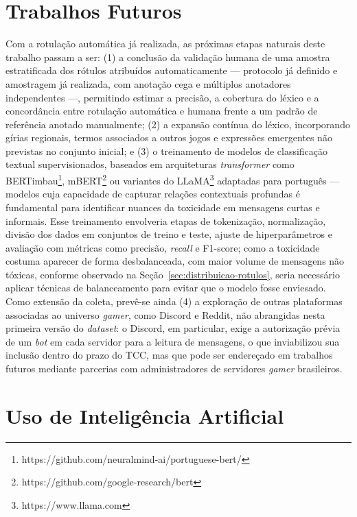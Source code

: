 \documentclass{eic-bcc-tcc}
\begin{document}
\section{Trabalhos Futuros}
\label{sec:trabalhos-futuros}

Com a rotulação automática já realizada, as próximas etapas naturais deste trabalho passam a ser: (1) a conclusão da validação humana de uma amostra estratificada dos rótulos atribuídos automaticamente — protocolo já definido e amostragem já realizada, com anotação cega e múltiplos anotadores independentes —, permitindo estimar a precisão, a cobertura do léxico e a concordância entre rotulação automática e humana frente a um padrão de referência anotado manualmente; (2) a expansão contínua do léxico, incorporando gírias regionais, termos associados a outros jogos e expressões emergentes não previstas no conjunto inicial; e (3) o treinamento de modelos de classificação textual supervisionados, baseados em arquiteturas \textit{transformer} como BERTimbau\footnote{https://github.com/neuralmind-ai/portuguese-bert/}, mBERT\footnote{https://github.com/google-research/bert} ou variantes do LLaMA\footnote{https://www.llama.com} adaptadas para português — modelos cuja capacidade de capturar relações contextuais profundas é fundamental para identificar nuances da toxicidade em mensagens curtas e informais. Esse treinamento envolveria etapas de tokenização, normalização, divisão dos dados em conjuntos de treino e teste, ajuste de hiperparâmetros e avaliação com métricas como precisão, \textit{recall} e F1-score; como a toxicidade costuma aparecer de forma desbalanceada, com maior volume de mensagens não tóxicas, conforme observado na Seção~\ref{sec:distribuicao-rotulos}, seria necessário aplicar técnicas de balanceamento para evitar que o modelo fosse enviesado. Como extensão da coleta, prevê-se ainda (4) a exploração de outras plataformas associadas ao universo \textit{gamer}, como Discord e Reddit, não abrangidas nesta primeira versão do \textit{dataset}: o Discord, em particular, exige a autorização prévia de um \textit{bot} em cada servidor para a leitura de mensagens, o que inviabilizou sua inclusão dentro do prazo do TCC, mas que pode ser endereçado em trabalhos futuros mediante parcerias com administradores de servidores \textit{gamer} brasileiros.

\section{Uso de Inteligência Artificial}
\end{document}

